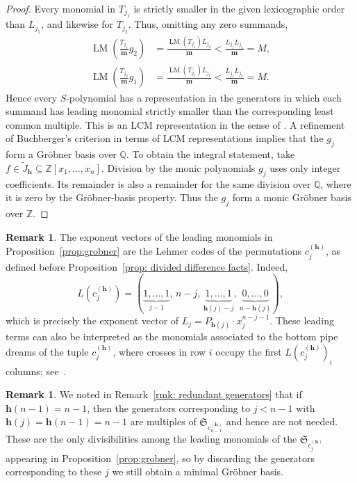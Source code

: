 \documentclass[11pt]{amsart}
\theoremstyle{plain}
\theoremstyle{definition}
\newtheorem{rmk}[thm]{Remark}
\newcommand{\hess}{{\mathbf h}}
\newcommand{\Z}{\mathbb{ Z}}           %
\newcommand{\Q}{\mathbb{ Q}}           %
\numberwithin{equation}{section}
\begin{document}
\begin{proof}
Every monomial in $T_{j_1}$ is strictly smaller in the given lexicographic order than $L_{j_1}$,
and likewise for $T_{j_2}$. Thus, omitting any zero summands,
\begin{align*}
\operatorname{LM}\!\left(\frac{T_{j_1}}{\mathbf{m}}g_2\right)
&=\frac{\operatorname{LM}(T_{j_1})L_{j_2}}{\mathbf{m}}
 <\frac{L_{j_1}L_{j_2}}{\mathbf{m}}=M,\\
\operatorname{LM}\!\left(\frac{T_{j_2}}{\mathbf{m}}g_1\right)
&=\frac{\operatorname{LM}(T_{j_2})L_{j_1}}{\mathbf{m}}
 <\frac{L_{j_1}L_{j_2}}{\mathbf{m}}=M.
\end{align*}
Hence every $S$-polynomial has a representation in the
generators in which each summand has leading monomial
strictly smaller than the corresponding least common
multiple. This is an LCM representation in the sense of \cite[Chapter~2, \S~9, Definition~5]{CoxLittleOShea2015}. A refinement of Buchberger's criterion in terms of LCM representations \cite[Chapter~2, \S~9, Theorem~6]{CoxLittleOShea2015} implies 
that the $g_j$ form a Gr\"obner basis over $\mathbb{Q}$. To obtain the integral statement, take
$f\in\tilde{J}_\hess\subseteq\Z[x_1,\ldots,x_n]$.
Division by the monic polynomials $g_j$ uses only
integer coefficients. Its remainder is also a
remainder for the same division over $\Q$, where it
is zero by the Gr\"obner-basis property.
Thus the $g_j$ form a monic Gr\"obner basis over $\Z$.
\end{proof}

\begin{rmk}
The exponent vectors of the leading monomials in Proposition~\ref{prop:grobner}  are the Lehmer codes of the permutations $c_j^{(\hess)}$, as defined before Proposition~\ref{prop: divided difference facts}. Indeed, 
\[
L(c_j^{(\hess)}) = (\underbrace{1,\ldots,1}_{j-1},\, n-j,\, \underbrace{1,\ldots,1}_{\hess(j)-j},\, \underbrace{0,\ldots,0}_{n-\hess(j)}),
\]
which is precisely the exponent vector of $L_j=P_{\hess(j)}\cdot x_j^{n-j-1}$.
These leading terms can also be interpreted as the monomials associated to the bottom pipe dreams of the tuple $c_j^{(\hess)}$, where crosses in row $i$ occupy the first $L(c_j^{(\hess)})_i$ columns; see~\cite{BergeronBilley1993}.
\end{rmk}

\begin{rmk}\label{remark: redundancy 2}
We noted in Remark~\ref{rmk: redundant generators} that if $\hess(n-1)=n-1$, then the generators corresponding to $j<n-1$ with $\hess(j)=\hess(n-1)=n-1$ are multiples of $\mathfrak{S}_{c_{n-1}^{(\hess)}}$ and hence are not needed. 
These are the only divisibilities among the leading monomials of the $\mathfrak{S}_{c_j^{(\hess)}}$ appearing in Proposition~\ref{prop:grobner}, so by discarding the generators corresponding to these $j$  we still obtain a minimal Gr\"obner basis. 
\end{rmk}
\end{document}
